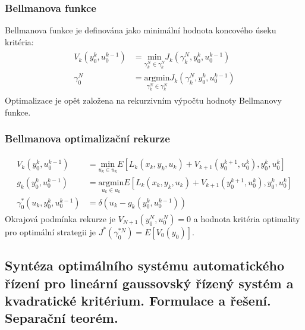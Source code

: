 \subsubsection*{Bellmanova funkce}
Bellmanova funkce je definována jako minimální hodnota koncového úseku kritéria:
\begin{align*}
\begin{split}
V_k(y_0^k, u_0^{k-1}) &= \underset{\gamma_k^N \in \gamma_k^N}{\mathrm{min}} J_k(\gamma_k^N, y_0^k, u_0^{k-1}) \\
\gamma_0^N &= \underset{\gamma_k^N \in \gamma_k^N}{\mathrm{argmin}} J_k(\gamma_k^N, y_0^k, u_0^{k-1})
\end{split}
\end{align*}
Optimalizace je opět založena na rekurzivním výpočtu hodnoty Bellmanovy funkce.

\subsubsection*{Bellmanova optimalizační rekurze}
\begin{align*}
\begin{split}
V_k(y_0^k, u_0^{k-1}) &= \underset{u_k \in u_k}{\mathrm{min}} E \left[ L_k(x_k, y_k, u_k) + V_{k+1}(y_0^{k+1}, u_0^k), y_0^k, u_0^k \right] \\
g_k(y_0^k, u_0^{k-1}) &= \underset{u_k \in u_k}{\mathrm{argmin}} E \left[ L_k(x_k, y_k, u_k) + V_{k+1}(y_0^{k+1}, u_0^k), y_0^k, u_0^k \right] \\
\gamma_0^*(u_k, y_0^k, u_0^{k-1}) &= \delta (u_k - g_k(y_0^k, u_0^{k-1}))
\end{split}
\end{align*}
Okrajová podmínka rekurze je $ V_{N+1}(y_0^N, u_0^N) = 0 $ a hodnota kritéria optimality pro optimální strategii je $ J^*(\gamma_0^{* N}) = E [V_0(y_0)] $.

\subsection{Syntéza optimálního systému automatického řízení pro lineární gaussovský řízený systém a kvadratické kritérium. Formulace a řešení. Separační teorém.}
